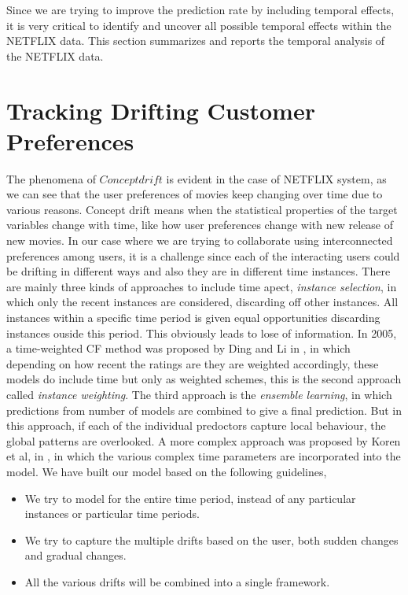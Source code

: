Since we are trying to improve the prediction rate by including temporal
effects, it is very critical to identify and uncover all possible temporal
effects within the NETFLIX data. This section summarizes and reports the
temporal analysis of the NETFLIX data.

\section{Tracking Drifting Customer Preferences}
The phenomena of $Concept drift$ is evident in the case of NETFLIX system, as we
can see that the user preferences of movies keep changing over time due to
various reasons. Concept drift means when the statistical properties of the
target variables change with time, like how user preferences change with new
release of new movies. In our case where we are trying to collaborate using
interconnected preferences among users, it is a challenge since each of the
interacting users could be drifting in different ways and also they are in
different time instances. There are mainly three kinds of approaches to include
time apect, \emph{instance selection}, in which only the recent instances are
considered, discarding off other instances. All instances within a specific time
period is given equal opportunities discarding instances ouside this period.
This obviously leads to lose of information.  In 2005, a time-weighted CF method
was proposed by Ding and Li in \cite{Ding:2005:TWC:1099554.1099689}, in
which depending on how recent the ratings are they are weighted accordingly,
these models do include time but only as weighted schemes, this is the second
approach called \emph{instance weighting}. The third approach is the
\emph{ensemble learning}, in which predictions from number of models are
combined to give a final prediction. But in this approach, if each of the
individual predoctors capture local behaviour, the global patterns are
overlooked.  A more complex approach was proposed by Koren et al, in
\cite{Koren:2010:CFT:1721654.1721677}, in
which the various complex time parameters are incorporated into the model.
We have built our model based on the following guidelines, \\
\begin{itemize}
  \item We try to model for the entire time period, instead of any particular
instances or particular time periods.
  \item We try to capture the multiple drifts based on the user, both sudden
changes and gradual changes.
  \item All the various drifts will be combined into a single framework.
\end{itemize}

